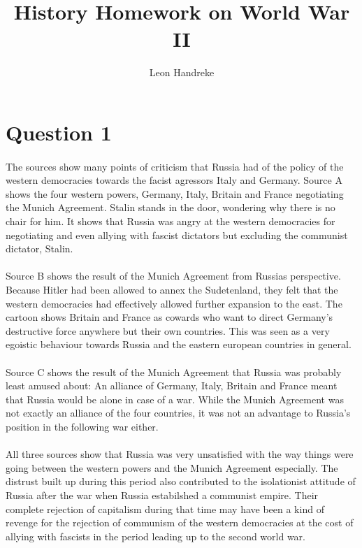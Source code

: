 \documentclass[11pt]{article}
\title{History Homework on World War II}
\author{Leon Handreke}
\date{}                                           %
\begin{document}
\maketitle
{}\selectfont

\section{Question 1}
\paragraph{}
The sources show many points of criticism that Russia had of the policy of the western democracies towards the facist agressors Italy and Germany. Source A shows the four western powers, Germany, Italy, Britain and France negotiating the Munich Agreement. Stalin stands in the door, wondering why there is no chair for him. It shows that Russia was angry at the western democracies for negotiating and even allying with fascist dictators but excluding the communist dictator, Stalin.

\paragraph{}
Source B shows the result of the Munich Agreement from Russias perspective. Because Hitler had been allowed to annex the Sudetenland, they felt that the western democracies had effectively allowed further expansion to the east. The cartoon shows Britain and France as cowards who want to direct Germany's destructive force anywhere but their own countries. This was seen as a very egoistic behaviour towards Russia and the eastern european countries in general.

\paragraph{}
Source C shows the result of the Munich Agreement that Russia was probably least amused about: An alliance of Germany, Italy, Britain and France meant that Russia would be alone in case of a war. While the Munich Agreement was not exactly an alliance of the four countries, it was not an advantage to Russia's position in the following war either.

\paragraph{}
All three sources show that Russia was very unsatisfied with the way things were going between the western powers and the Munich Agreement especially. The distrust built up during this period also contributed to the isolationist attitude of Russia after the war when Russia estabilshed a communist empire. Their complete rejection of capitalism during that time may have been a kind of revenge for the rejection of communism of the western democracies at the cost of allying with fascists in the period leading up to the second world war.
\end{document}

